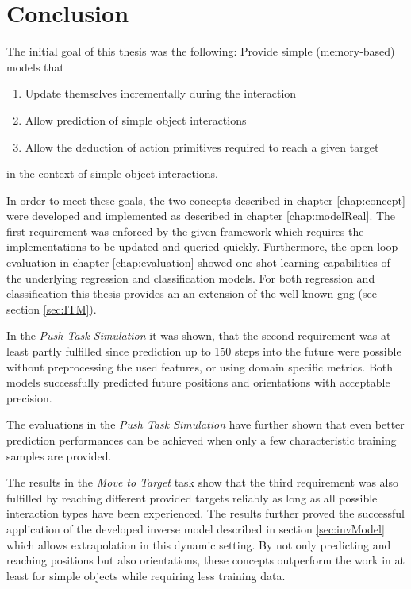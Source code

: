 \chapter{Conclusion \label{chap:conclusion}}


The initial goal of this thesis was the following:
Provide simple (memory-based) models that
\begin{enumerate}
\item Update themselves incrementally during the interaction
\item Allow prediction of simple object interactions
\item Allow the deduction of action primitives required to reach a given target
\end{enumerate}
in the context of simple object interactions.

In order to meet these goals, the two concepts described in chapter \ref{chap:concept} were developed and implemented as described in chapter \ref{chap:modelReal}. 
The first requirement was enforced by the given framework which requires the implementations to be updated and queried quickly. Furthermore, the open loop evaluation in chapter \ref{chap:evaluation} showed one-shot learning capabilities of the underlying regression and classification models. For both regression and classification this thesis provides an an extension of the well known \gls{gng} (see section \ref{sec:ITM}).

In the \textit{Push Task Simulation} it was shown, that the second requirement was at least partly fulfilled since prediction up to 150 steps into the future were possible without preprocessing the used features, or using domain specific metrics. Both models successfully predicted future positions and orientations with acceptable precision.

The evaluations in the \textit{Push Task Simulation} have further shown that even better prediction performances can be achieved when only a few characteristic training samples are provided.

The results in the \textit{Move to Target} task show that the third requirement was also fulfilled by reaching different provided targets reliably as long as all possible interaction types have been experienced. The results further proved the successful application of the developed inverse model described in section \ref{sec:invModel} which allows extrapolation in this dynamic setting.
By not only predicting and reaching positions but also orientations, these concepts outperform the work in \cite{pushing} at least for simple objects while requiring less training data. 

